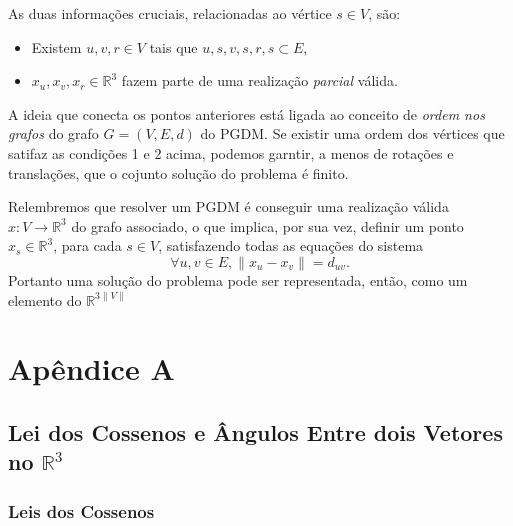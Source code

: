 \documentclass[a4paper,12pt]{article}
\begin{document}
	As duas informações cruciais, relacionadas ao vértice $s\in V$, são:
	\begin{itemize}
		\item Existem $u, v, r \in V$ tais que ${u, s}, {v, s}, {r, s}\subset E$,
		\item $x_{u}, x_{v}, x_{r} \in\mathbb{R}^{3}$ fazem parte de uma realização \textit{parcial} válida. 
	\end{itemize}
	
	A ideia que conecta os pontos anteriores está ligada ao conceito de \textit{ordem nos grafos} do grafo $G = (V, E, d)$ do PGDM. Se existir uma ordem dos vértices que satifaz as condições 1 e 2 acima, podemos garntir, a menos de rotações e translações, que o cojunto solução do problema é finito.
	
	Relembremos que resolver um PGDM é conseguir uma realização válida $x: V \rightarrow\mathbb{R}^{3}$ do grafo associado, o que implica, por sua vez, definir um ponto $x_{s}\in\mathbb{R}^3$, para cada $s\in V$, satisfazendo todas as equações do sistema
	$$
	\forall {u, v}\in E, \|x_{u} - x_{v}\| = d_{uv}.
	$$
	Portanto uma solução do problema pode ser representada, então, como um elemento do $\mathbb{R}^{3\|V\|}$
	\\
	\newpage
	
	
	
	
	
	\newpage
	
	\section*{Apêndice A}
	\subsection*{Lei dos Cossenos e Ângulos Entre dois Vetores no $\mathbb{R}^3$}
	
	\subsubsection*{Leis dos Cossenos}
\end{document}

